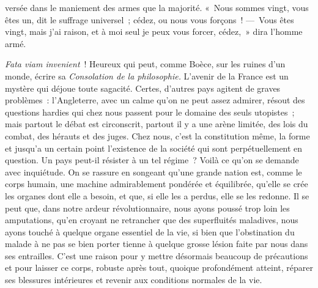 \documentclass[french,twoside]{book} %
\begin{document}
versée dans le maniement des armes que la majorité. « Nous sommes vingt, vous êtes un, dit le suffrage universel ; cédez, ou nous vous forçons ! — Vous êtes vingt, mais j’ai raison, et à moi seul je peux vous forcer, cédez, » dira l’homme armé.\par
{\itshape Fata viam invenient} ! Heureux qui peut, comme Boèce, sur les ruines d’un monde, écrire sa {\itshape Consolation de la philosophie.} L’avenir de la France est un mystère qui déjoue toute sagacité. Certes, d’autres pays agitent de graves problèmes : l’Angleterre, avec un calme qu’on ne peut assez admirer, résout des questions hardies qui chez nous passent pour le domaine des seuls utopistes ; mais partout le débat est circonscrit, partout il y a une arène limitée, des lois du combat, des hérauts et des juges. Chez nous, c’est la constitution même, la forme et jusqu’a un certain point l’existence de la société qui sont perpétuellement en question. Un pays peut-il résister à un tel régime ? Voilà ce qu’on se demande avec inquiétude. On se rassure en songeant qu’une grande nation est, comme le corps humain, une machine admirablement pondérée et équilibrée, qu’elle se crée les organes dont elle a besoin, et que, si elle les a perdus, elle se les redonne. Il se peut que, dans notre ardeur révolutionnaire, nous ayons poussé trop loin les amputations, qu’en croyant ne retrancher que des superfluités maladives, nous ayons touché à quelque organe essentiel de la vie, si bien que l’obstination du malade à ne pas se bien porter tienne à quelque grosse lésion faite par nous dans ses entrailles. C’est une raison pour y mettre désormais beaucoup de précautions et pour laisser ce corps, robuste après tout, quoique profondément atteint, réparer ses blessures intérieures et revenir aux conditions normales de la vie.\par
\end{document}
